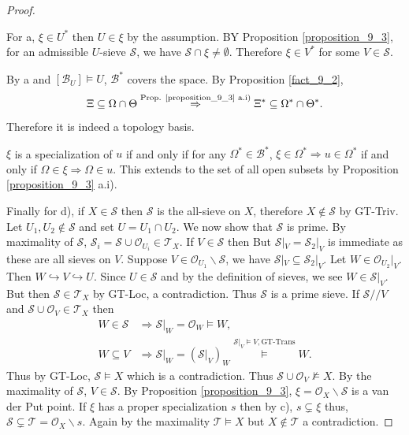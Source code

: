 \documentclass[10pt]{article}
\numberwithin{equation}{section}
\theoremstyle{definition}
\newcommand{\Ouv}{\mathscr{O}}
\newcommand{\sS}[0]{\mathscr{S}}
\newcommand{\sT}[0]{\mathscr{T}}
\newcommand{\cB}[0]{\mathcal{B}}
\begin{document}
\begin{proof}$\:$
    \par For a, $\xi\in U^*$ then $U\in \xi$ by the assumption. BY Proposition \ref{proposition_9_3}, for an admissible $U$-sieve $\sS$, we have $\sS\cap \xi\not=\emptyset$. Therefore $\xi\in V^*$ for some $V\in\sS$.
    \par By a and $[\cB_U]\vDash U$, $\cB^*$ covers the space. By Proposition \ref{fact_9_2},
    \begin{equation*}
        \Xi\subseteq\Omega\cap\Theta\stackrel{\text{Prop. \ref{proposition_9_3} a.i)}}{\Rightarrow }\Xi^*\subseteq \Omega^*\cap\Theta^*.
    \end{equation*}
    Therefore it is indeed a topology basis.
    \par $\xi$ is a specialization of $u$ if and only if for any $\Omega^*\in\cB^*$, $\xi\in\Omega^*\Rightarrow u\in\Omega^*$ if and only if $\Omega\in\xi\Rightarrow \Omega\in u$. This extends to the set of all open subsets by Proposition \ref{proposition_9_3} a.i).
    \par Finally for d), if $X\in\sS$ then $\sS$ is the all-sieve on $X$, therefore $X\not\in\sS$ by GT-Triv. Let $U_1,U_2\not\in\sS$ and set $U=U_1\cap U_2$. We now show that $\sS$ is prime. By maximality of $\sS$, $\sS_i=\sS\cup\Ouv_{U_i}\in\mathcal{T}_X$. If $V\in\sS$ then But $\sS|_V=\sS_2|_V$ is immediate as these are all sieves on $V$. Suppose $V\in\Ouv_{U_1}\backslash \sS$, we have $\sS|_V\subseteq\sS_2|_V$. Let $W\in\Ouv_{U_2}|_V$. Then $W\hookrightarrow V\hookrightarrow U$. Since $U\in\sS$ and by the definition of sieves, we see $W\in\sS|_V$.
    But then $\sS\in\mathcal{T}_X$ by GT-Loc, a contradiction. Thus $\sS$ is a prime sieve. If $\sS//V$ and $\sS\cup\Ouv_V\in\mathcal{T}_X$ then
    \begin{align*}
    W\in\sS&\Rightarrow \sS|_W = \Ouv_W\vDash W,\\
    W\subseteq V&\Rightarrow \sS|_W = (\sS|_V)_W \stackrel{\sS|_V\vDash V, \text{GT-Trans}}{\vDash} W.
    \end{align*}
    Thus by GT-Loc, $\sS\vDash X$ which is a contradiction. Thus $\sS\cup\Ouv_V\not\vDash X$. By the maximality of $\sS$, $V\in\sS$. By Proposition \ref{proposition_9_3}, $\xi=\Ouv_X\backslash\sS$ is a van der Put point. If $\xi$ has a proper specialization $s$ then by c), $s\subsetneq\xi$ thus, $\sS\subsetneq\mathscr{T}=\Ouv_X\backslash s$. Again by the maximality $\sT\vDash X$ but $X\not\in\sT$ a contradiction.
\end{proof}
\end{document}

